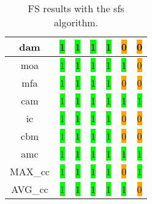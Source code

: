 \begin{table}[H]
\begin{tabular}{|c|c|c|c|c|c|c|}
        \acrshort{dam} & \colorbox{lime}{1} & \colorbox{lime}{1} & \colorbox{lime}{1} & \colorbox{lime}{1} & \colorbox{orange}{0} & \colorbox{orange}{0} \\ \hline
        \acrshort{moa} & \colorbox{lime}{1} & \colorbox{lime}{1} & \colorbox{lime}{1} & \colorbox{lime}{1} & \colorbox{lime}{1} & \colorbox{orange}{0} \\ \hline
        \acrshort{mfa} & \colorbox{lime}{1} & \colorbox{lime}{1} & \colorbox{lime}{1} & \colorbox{lime}{1} & \colorbox{orange}{0} & \colorbox{orange}{0} \\ \hline
        \acrshort{cam} & \colorbox{lime}{1} & \colorbox{lime}{1} & \colorbox{lime}{1} & \colorbox{lime}{1} & \colorbox{lime}{1} & \colorbox{lime}{1} \\ \hline
        \acrshort{ic} & \colorbox{lime}{1} & \colorbox{lime}{1} & \colorbox{lime}{1} & \colorbox{lime}{1} & \colorbox{orange}{0} & \colorbox{orange}{0} \\ \hline
        \acrshort{cbm} & \colorbox{lime}{1} & \colorbox{lime}{1} & \colorbox{lime}{1} & \colorbox{lime}{1} & \colorbox{orange}{0} & \colorbox{orange}{0} \\ \hline
        \acrshort{amc} & \colorbox{lime}{1} & \colorbox{lime}{1} & \colorbox{lime}{1} & \colorbox{lime}{1} & \colorbox{lime}{1} & \colorbox{lime}{1} \\ \hline
        MAX\_\acrshort{cc} & \colorbox{lime}{1} & \colorbox{lime}{1} & \colorbox{lime}{1} & \colorbox{lime}{1} & \colorbox{orange}{0} & \colorbox{lime}{1} \\ \hline
        AVG\_\acrshort{cc} & \colorbox{lime}{1} & \colorbox{lime}{1} & \colorbox{lime}{1} & \colorbox{lime}{1} & \colorbox{lime}{1} & \colorbox{orange}{0} \\ \hline
    \end{tabular}
\caption{FS results with the \acrlong{sfs} algorithm.}
\label{tab:sfs-output}
\end{table}

